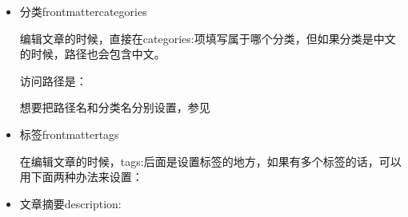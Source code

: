 \documentclass[letterpaper,12pt,english]{sphinxmanual}
\begin{document}
\begin{sphinxVerbatim}[commandchars=\\\{\}]
 
  
 
 
 
 
 
 
\end{sphinxVerbatim}
\begin{itemize}
\item {} 
分类frontmatter\sphinxhyphen{}categories

\label{\detokenize{001software/001install/001._u7f51_u7ad9/hexo:frontmatter-categories}}
编辑文章的时候，直接在categories:项填写属于哪个分类，但如果分类是中文的时候，路径也会包含中文。

访问路径是：


想要把路径名和分类名分别设置，参见 {\hyperref[\detokenize{001software/001install/001._u7f51_u7ad9/hexo:id20}]{}}

\item {} 
标签frontmatter\sphinxhyphen{}tags

\label{\detokenize{001software/001install/001._u7f51_u7ad9/hexo:frontmatter-tags}}
在编辑文章的时候，tags:后面是设置标签的地方，如果有多个标签的话，可以用下面两种办法来设置：

\begin{sphinxVerbatim}[commandchars=\\\{\}]
 \PYG{p}{[}\PYG{p}{]}

 
 
 
\end{sphinxVerbatim}

\item {} 
文章摘要description:


\end{itemize}
\end{document}
